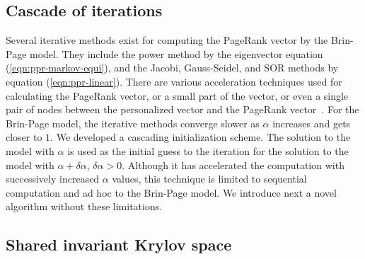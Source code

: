 \documentclass[conference]{IEEEtran}
\begin{document}
 
%



%

\subsection{Cascade of iterations} 
\label{subsec:cascade}
% 


Several iterative methods exist for computing the PageRank vector by the
Brin-Page model. They include the power method by the eigenvector
equation (\ref{eqn:ppr-markov-equi}), and the Jacobi, Gauss-Seidel, and
SOR methods by equation (\ref{eqn:ppr-linear}). There are various
acceleration techniques used for calculating the PageRank vector, or a
small part of the vector, or even a single pair of nodes between
the personalized vector and the PageRank vector~\cite{kamvar2003extrapolation,
ilprints579, kamvar2004adaptive, DBLP:journals/corr/LofgrenBGS14}.
% 
For the Brin-Page model, the iterative methods converge slower as
$\alpha$ increases and gets closer to $1$. We developed a cascading
initialization scheme. The solution to the model with $\alpha$ is used
as the initial guess to the iteration for the solution to the model with
$\alpha+\delta \alpha$, $\delta \alpha > 0$. Although it has accelerated
the computation with successively increased $\alpha$ values, this
technique is limited to sequential computation and ad hoc to the
Brin-Page model. We introduce next a novel algorithm without these
limitations.


 
% 

\subsection{Shared invariant Krylov space} 
\label{subsec:SIK-space}
%
\end{document}
